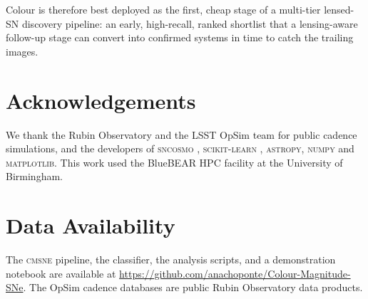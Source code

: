 \documentclass[fleqn,usenatbib]{mnras}
\begin{document}
Colour is therefore best deployed as the first, cheap stage of a multi-tier
lensed-SN discovery pipeline: an early, high-recall, ranked shortlist that a
lensing-aware follow-up stage can convert into confirmed systems in time to catch
the trailing images.

\section*{Acknowledgements}
We thank the Rubin Observatory and the LSST OpSim team for public cadence
simulations, and the developers of \textsc{sncosmo} \citep{Barbary2016},
\textsc{scikit-learn} \citep{Pedregosa2011}, \textsc{astropy}, \textsc{numpy}
and \textsc{matplotlib}. This work used the BlueBEAR HPC facility at the
University of Birmingham.

\section*{Data Availability}
The \textsc{cmsne} pipeline, the classifier, the analysis scripts, and a
demonstration notebook are available at
\url{https://github.com/anachoponte/Colour-Magnitude-SNe}. The OpSim cadence
databases are public Rubin Observatory data products.




\bsp
\label{lastpage}
\end{document}
